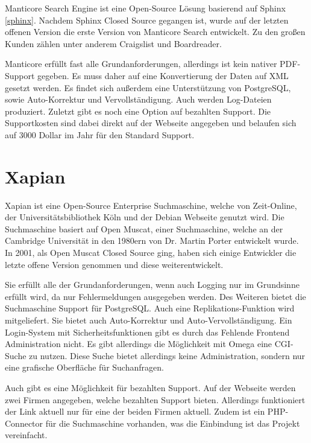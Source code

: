Manticore Search Engine ist eine Open-Source Lösung basierend auf Sphinx \ref{sphinx}. Nachdem Sphinx Closed Source gegangen ist, wurde auf der letzten offenen Version die erste Version von Manticore Search entwickelt. Zu den großen Kunden zählen unter anderem Craigslist und Boardreader.

Manticore erfüllt fast alle Grundanforderungen, allerdings ist kein nativer PDF-Support gegeben. Es muss daher auf eine Konvertierung der Daten auf XML gesetzt werden. Es findet sich außerdem eine Unterstützung von PostgreSQL, sowie Auto-Korrektur und Vervollständigung. Auch werden Log-Dateien produziert. Zuletzt gibt es noch eine Option auf bezahlten Support. Die Supportkosten sind dabei direkt auf der Webseite angegeben und belaufen sich auf 3000 Dollar im Jahr für den Standard Support. \cite{ManticoreSoftwareLtd.2019}

\section{Xapian}
\label{xapian}

Xapian ist eine Open-Source Enterprise Suchmaschine, welche von Zeit-Online, der Universitätsbibliothek Köln und der Debian Webseite genutzt wird. Die Suchmaschine basiert auf Open Muscat, einer Suchmaschine, welche an der Cambridge Universität in den 1980ern von Dr. Martin Porter entwickelt wurde. In 2001, als Open Muscat Closed Source ging, haben sich einige Entwickler die letzte offene Version genommen und diese weiterentwickelt.

Sie erfüllt alle der Grundanforderungen, wenn auch Logging nur im Grundsinne erfüllt wird, da nur Fehlermeldungen ausgegeben werden. Des Weiteren bietet die Suchmaschine Support für PostgreSQL. Auch eine Replikations-Funktion wird mitgeliefert. Sie bietet auch Auto-Korrektur und Auto-Vervollständigung. Ein Login-System mit Sicherheitsfunktionen gibt es durch das Fehlende Frontend Administration nicht. Es gibt allerdings die Möglichkeit mit Omega eine CGI-Suche zu nutzen. Diese Suche bietet allerdings keine Administration, sondern nur eine grafische Oberfläche für Suchanfragen.

Auch gibt es eine Möglichkeit für bezahlten Support. Auf der Webseite werden zwei Firmen angegeben, welche bezahlten Support bieten. Allerdings funktioniert der Link aktuell nur für eine der beiden Firmen aktuell. Zudem ist ein PHP-Connector für die Suchmaschine vorhanden, was die Einbindung ist das Projekt vereinfacht. \cite{XAP.2019}

